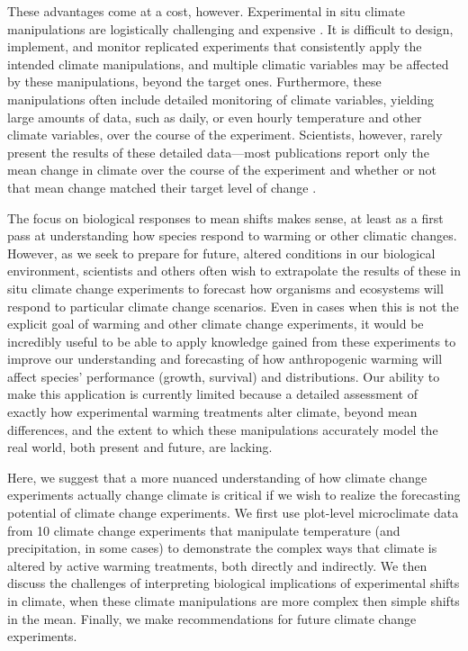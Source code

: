 \documentclass{article}
\begin{document}
\par These advantages come at a cost, however. Experimental in situ climate manipulations are logistically challenging and expensive \citep{aronson2009}. It is difficult to design, implement, and monitor replicated experiments that consistently apply the intended climate manipulations, and multiple climatic variables may be affected by these manipulations, beyond the target ones. 
Furthermore, these manipulations often include detailed monitoring of climate variables, yielding large amounts of data, such as daily, or even hourly temperature and other climate variables, over the course of the experiment. Scientists, however, rarely present the results of these detailed data---most publications report only the mean change in climate over the course of the experiment and whether or not that mean change matched their target level of change \citep{price1998,clark2014a,clark2014b,rollinson2012}. 
\par The focus on biological responses to mean shifts makes sense, at least as a first pass at understanding how species respond to warming or other climatic changes. However, as we seek to prepare for future, altered conditions in our biological environment, scientists and others often wish to extrapolate the results of these in situ climate change experiments to forecast how organisms and ecosystems will respond to particular climate change scenarios. 
Even in cases when this is not the explicit goal of warming and other climate change experiments, it would be incredibly useful to be able to apply knowledge gained from these experiments to improve our understanding and forecasting of how anthropogenic warming will affect species' performance (growth, survival) and distributions. Our ability to make this application is currently limited because a detailed assessment of exactly how experimental warming treatments alter climate, beyond mean differences, and the extent to which these manipulations accurately model the real world, both present and future, are lacking. 
\par Here, we suggest that a more nuanced understanding of how climate change experiments actually change climate is critical if we wish to realize the forecasting potential of climate change experiments. We first use plot-level microclimate data from 10 climate change experiments that manipulate temperature (and precipitation, in some cases) to demonstrate the complex ways that climate is altered by active warming treatments, both directly and indirectly. We then discuss the challenges of interpreting biological implications of experimental shifts in climate, when these climate manipulations are more complex then simple shifts in the mean. Finally, we make recommendations for future climate change experiments.
\end{document}
